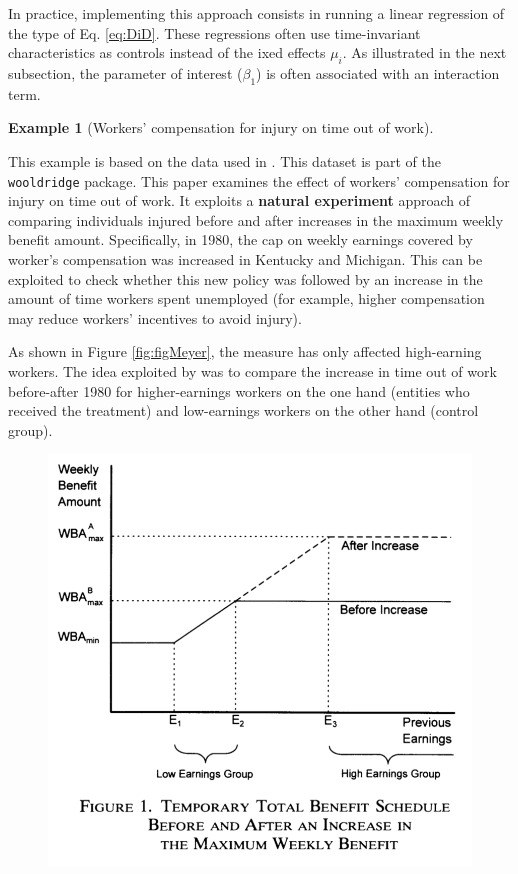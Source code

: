 \documentclass[
  12pt,
]{book}
\theoremstyle{definition}
\theoremstyle{definition}
\newtheorem{example}{Example}[chapter]
\theoremstyle{definition}
\theoremstyle{definition}
\theoremstyle{remark}
\begin{document}
In practice, implementing this approach consists in running a linear regression of the type of Eq. \eqref{eq:DiD}. These regressions often use time-invariant characteristics as controls instead of the ixed effects \(\mu_i\). As illustrated in the next subsection, the parameter of interest (\(\beta_1\)) is often associated with an interaction term.

\begin{example}[Workers' compensation for injury on time out of work]
\protect\hypertarget{exm:DiDexm}{}\label{exm:DiDexm}

This example is based on the data used in \citet{Meyer_Viscusi_Durbin_1995}. This dataset is part of the \texttt{wooldridge} package. This paper examines the effect of workers' compensation for injury on time out of work. It exploits a \textbf{natural experiment} approach of comparing individuals injured before and after increases in the maximum weekly benefit amount. Specifically, in 1980, the cap on weekly earnings covered by worker's compensation was increased in Kentucky and Michigan. This can be exploited to check whether this new policy was followed by an increase in the amount of time workers spent unemployed (for example, higher compensation may reduce workers' incentives to avoid injury).

As shown in Figure \ref{fig:figMeyer}, the measure has only affected high-earning workers. The idea exploited by \citet{Meyer_Viscusi_Durbin_1995} was to compare the increase in time out of work before-after 1980 for higher-earnings workers on the one hand (entities who received the treatment) and low-earnings workers on the other hand (control group).

\begin{figure}

{\centering \includegraphics[width=0.9\linewidth]{images/Figure_Meyer_et_al} 

}
\end{figure}
\end{example}
\end{document}
